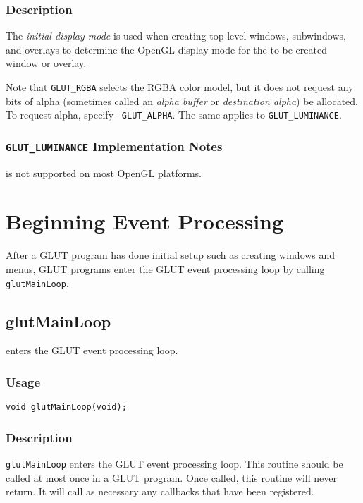 \subsubsection*{Description}

The {\em initial display mode} is used when creating top-level windows,
subwindows, and overlays to determine the OpenGL display mode for the to-be-created window
or overlay.

Note that {\tt GLUT\_RGBA} selects the RGBA color model, but it does
not request any bits of alpha (sometimes called an {\em alpha buffer}
or {\em destination alpha}) be allocated.  To request alpha, specify {\tt
GLUT\_ALPHA}.  The same applies to {\tt GLUT\_LUMINANCE}.

\subsubsection*{{\tt GLUT\_LUMINANCE} Implementation Notes}

 is not supported on most OpenGL platforms.

\section{Beginning Event Processing}

After a GLUT program has done initial setup such as creating
windows and menus, GLUT programs enter the GLUT event processing loop
by calling {\tt glutMainLoop}.

\subsection{glutMainLoop}

 enters the GLUT event processing loop.

\subsubsection*{Usage}

\begin{verbatim}
void glutMainLoop(void);
\end{verbatim}
 
\subsubsection*{Description}

{\tt glutMainLoop} enters the GLUT event processing loop.
This routine should be called at most once in a GLUT program.  Once called, this routine
will never return.  It will call as necessary any callbacks that have been registered.


